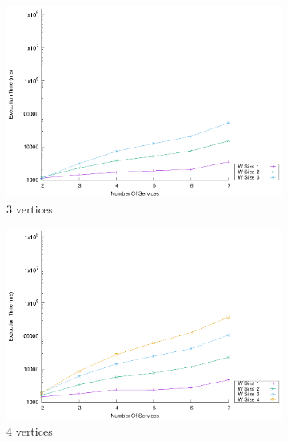   \begin{figure}[!htb]
    \centering
    \begin{subfigure}{0.45\textwidth}
      \includegraphics[width=\textwidth]{Images/graphs/window_time_performance_qualitative_n7_s7_50_80_n3}
      \caption{3 vertices}
      \label{fig:time_window_perce_wide_3n}
    \end{subfigure}
    \hfill
    \begin{subfigure}{0.45\textwidth}
      \includegraphics[width=\textwidth]{Images/graphs/window_time_performance_qualitative_n7_s7_50_80_n4}
      \caption{4 vertices}
      \label{fig:time_window_perce_wide_4n}
    \end{subfigure}
    \hfill
    \begin{subfigure}{0.45\textwidth}

\end{subfigure}
\end{figure}
